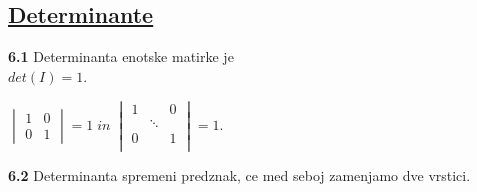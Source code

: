 \documentclass{article}
\begin{document}
\begin{multicols}{2}
\section{\underline{Determinante}}

\textbf{6.1} Determinanta enotske matirke je\\ $det(I) = 1$.
\begin{center}
    \begin{math}
        \begin{vmatrix}
            1 & 0\\
            0 & 1
        \end{vmatrix}
        = 1\; in\;
        \begin{vmatrix}
            1 & & 0\\
            & \ddots &\\
            0 & & 1\\
        \end{vmatrix}
        = 1.
    \end{math}
\end{center}

\textbf{6.2} Determinanta spremeni predznak, ce med seboj zamenjamo dve vrstici.


\end{multicols}
\end{document}
